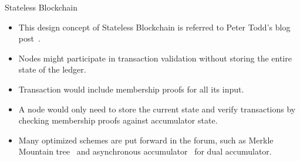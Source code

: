 \documentclass[biblatex,aspectratio=169,11pt]{mybeamer}
\begin{document}
\begin{frame}{Stateless Blockchain}
  \begin{itemize}[<+->]
   \item This design concept of \alert{Stateless Blockchain} is referred to Peter Todd's blog post~\cite{Tod}. 
   \item Nodes might participate in transaction validation without storing the entire state of the ledger.
   \item Transaction would include membership proofs for all its input.
   \item A node would only need to store the current state and verify transactions by checking membership proofs against accumulator state.
   \item Many optimized schemes are put forward in the forum, such as Merkle Mountain tree~\cite{MMR} and asynchronous accumulator~\cite{reyzin2016efficient} for dual accumulator.
 \end{itemize}
\end{frame}

\subsection{}
\end{document}
